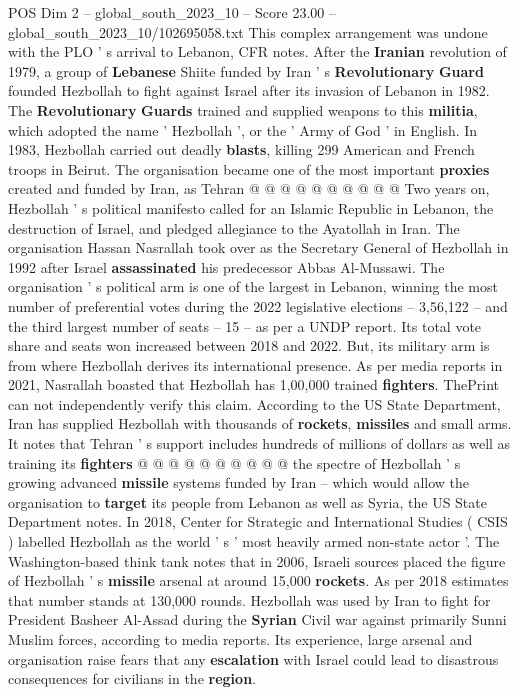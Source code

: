 \begin{textsample}{POS Dim 2 – global\_south\_2023\_10 – Score 23.00 – global\_south\_2023\_10/102695058.txt}
This complex arrangement was undone with the PLO ' s arrival to Lebanon, CFR notes.
After the \textbf{Iranian} revolution of 1979, a group of \textbf{Lebanese} Shiite funded by Iran ' s \textbf{Revolutionary} \textbf{Guard} founded Hezbollah to fight against Israel after its invasion of Lebanon in 1982.
The \textbf{Revolutionary} \textbf{Guards} trained and supplied weapons to this \textbf{militia}, which adopted the name ' Hezbollah ', or the ' Army of God ' in English.
In 1983, Hezbollah carried out deadly \textbf{blasts}, killing 299 American and French troops in Beirut.
The organisation became one of the most important \textbf{proxies} created and funded by Iran, as Tehran @ @ @ @ @ @ @ @ @ @ Two years on, Hezbollah ' s political manifesto called for an Islamic Republic in Lebanon, the destruction of Israel, and pledged allegiance to the Ayatollah in Iran.
The organisation Hassan Nasrallah took over as the Secretary General of Hezbollah in 1992 after Israel \textbf{assassinated} his predecessor Abbas Al-Mussawi.
The organisation ' s political arm is one of the largest in Lebanon, winning the most number of preferential votes during the 2022 legislative elections -- 3,56,122 -- and the third largest number of seats -- 15 -- as per a UNDP report.
Its total vote share and seats won increased between 2018 and 2022.
But, its military arm is from where Hezbollah derives its international presence.
As per media reports in 2021, Nasrallah boasted that Hezbollah has 1,00,000 trained \textbf{fighters}.
ThePrint can not independently verify this claim.
According to the US State Department, Iran has supplied Hezbollah with thousands of \textbf{rockets}, \textbf{missiles} and small arms.
It notes that Tehran ' s support includes hundreds of millions of dollars as well as training its \textbf{fighters} @ @ @ @ @ @ @ @ @ @ the spectre of Hezbollah ' s growing advanced \textbf{missile} systems funded by Iran -- which would allow the organisation to \textbf{target} its people from Lebanon as well as Syria, the US State Department notes.
In 2018, Center for Strategic and International Studies ( CSIS ) labelled Hezbollah as the world ' s ' most heavily armed non-state actor '.
The Washington-based think tank notes that in 2006, Israeli sources placed the figure of Hezbollah ' s \textbf{missile} arsenal at around 15,000 \textbf{rockets}.
As per 2018 estimates that number stands at 130,000 rounds.
Hezbollah was used by Iran to fight for President Basheer Al-Assad during the \textbf{Syrian} Civil war against primarily Sunni Muslim forces, according to media reports.
Its experience, large arsenal and organisation raise fears that any \textbf{escalation} with Israel could lead to disastrous consequences for civilians in the \textbf{region}.

\end{textsample}
